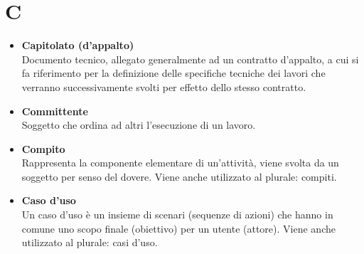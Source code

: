 \chapter{C} \label{C}
\begin{itemize}
	\item \textbf{Capitolato (d'appalto)}\\
	Documento tecnico, allegato generalmente ad un contratto d'appalto, a cui si fa riferimento per la definizione delle specifiche tecniche dei lavori che verranno successivamente svolti per effetto dello stesso contratto.

	\item \textbf{Committente}\\
	Soggetto che ordina ad altri l'esecuzione di un lavoro.
	
	\item \textbf{Compito}\\
	Rappresenta la componente elementare di un'attività, viene svolta da un soggetto per senso del dovere.
	Viene anche utilizzato al plurale: compiti.
	
	\item \textbf{Caso d'uso}\\
	Un caso d’uso è un insieme di scenari (sequenze di azioni) che hanno in comune uno scopo finale (obiettivo) per un utente (attore). 
	Viene anche utilizzato al plurale: casi d'uso.
\end{itemize}